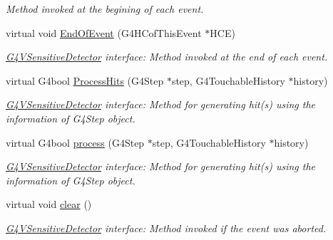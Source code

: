 \begin{DoxyCompactItemize}
\begin{DoxyCompactList}\small\item\em Method invoked at the begining of each event. \end{DoxyCompactList}\item 
virtual void \hyperlink{class_d_d4hep_1_1_simulation_1_1_geant4_sensitive_detector_a1275a33abdbd4efb70ee1698eda3d2db}{End\+Of\+Event} (G4\+H\+Cof\+This\+Event $\ast$H\+CE)
\begin{DoxyCompactList}\small\item\em \hyperlink{class_g4_v_sensitive_detector}{G4\+V\+Sensitive\+Detector} interface\+: Method invoked at the end of each event. \end{DoxyCompactList}\item 
virtual G4bool \hyperlink{class_d_d4hep_1_1_simulation_1_1_geant4_sensitive_detector_ac889694c4406ea089f3172b73da49134}{Process\+Hits} (G4\+Step $\ast$step, G4\+Touchable\+History $\ast$history)
\begin{DoxyCompactList}\small\item\em \hyperlink{class_g4_v_sensitive_detector}{G4\+V\+Sensitive\+Detector} interface\+: Method for generating hit(s) using the information of G4\+Step object. \end{DoxyCompactList}\item 
virtual G4bool \hyperlink{class_d_d4hep_1_1_simulation_1_1_geant4_sensitive_detector_aea5cd9b90bf1102dcf9e027f618cabe6}{process} (G4\+Step $\ast$step, G4\+Touchable\+History $\ast$history)
\begin{DoxyCompactList}\small\item\em \hyperlink{class_g4_v_sensitive_detector}{G4\+V\+Sensitive\+Detector} interface\+: Method for generating hit(s) using the information of G4\+Step object. \end{DoxyCompactList}\item 
virtual void \hyperlink{class_d_d4hep_1_1_simulation_1_1_geant4_sensitive_detector_a594a8e0083028c98326f99ace2f0f8dd}{clear} ()
\begin{DoxyCompactList}\small\item\em \hyperlink{class_g4_v_sensitive_detector}{G4\+V\+Sensitive\+Detector} interface\+: Method invoked if the event was aborted. \end{DoxyCompactList}\end{DoxyCompactItemize}
